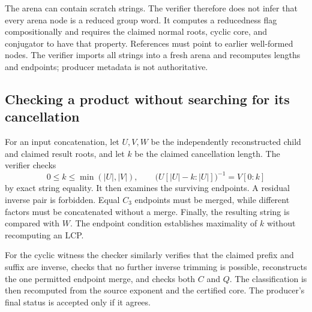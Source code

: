 \documentclass[11pt,letterpaper]{article}
\theoremstyle{definition}\newtheorem{definition}[theorem]{Definition}
\theoremstyle{remark}\newtheorem{remark}[theorem]{Remark}
\begin{document}
The arena can contain scratch strings. The verifier therefore does not infer that every arena node is a reduced group word. It computes a reducedness flag compositionally and requires the claimed normal roots, cyclic core, and conjugator to have that property. References must point to earlier well-formed nodes. The verifier imports all strings into a fresh arena and recomputes lengths and endpoints; producer metadata is not authoritative.

\subsection{Checking a product without searching for its cancellation}
For an input concatenation, let $U,V,W$ be the independently reconstructed child and claimed result roots, and let $k$ be the claimed cancellation length. The verifier checks
\[
 0\le k\le\min(|U|,|V|),\qquad
 \bigl(U[|U|-k:|U|]\bigr)^{-1}=V[0:k]
\]
by exact string equality. It then examines the surviving endpoints. A residual inverse pair is forbidden. Equal $C_3$ endpoints must be merged, while different factors must be concatenated without a merge. Finally, the resulting string is compared with $W$. The endpoint condition establishes maximality of $k$ without recomputing an LCP.

For the cyclic witness the checker similarly verifies that the claimed prefix and suffix are inverse, checks that no further inverse trimming is possible, reconstructs the one permitted endpoint merge, and checks both $C$ and $Q$. The classification is then recomputed from the source exponent and the certified core. The producer's final status is accepted only if it agrees.
\end{document}
